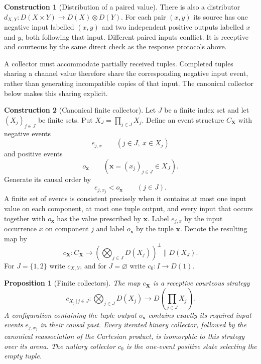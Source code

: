 \documentclass[11pt,a4paper]{article}
\numberwithin{equation}{section}
\newtheorem{proposition}[theorem]{Proposition}
\theoremstyle{definition}
\newtheorem{construction}[construction]{Construction}
\theoremstyle{remark}
\theoremstyle{plain}
\begin{document}
\begin{construction}[Distribution of a paired value]
There is also a distributor
$d_{X,Y}:D(X\times Y)\to D(X)\otimes D(Y)$. For each pair $(x,y)$ its
source has one negative input labelled $(x,y)$ and two independent positive
outputs labelled $x$ and $y$, both following that input. Different paired
inputs conflict. It is receptive and courteous by the same direct check as the
response protocols above.
\end{construction}

A collector must accommodate partially received tuples. Completed
tuples sharing a channel value therefore share the corresponding negative
input event, rather than generating incompatible copies of that input.
The canonical collector below makes this sharing explicit.

\begin{construction}[Canonical finite collector]
\label{con:egt-finite-collector}
Let $J$ be a finite index set and let $(X_j)_{j\in J}$ be finite sets. Put
$X_J=\prod_{j\in J}X_j$. Define an event structure $C_{\mathbf X}$ with
negative events
\[
 e_{j,x}\qquad(j\in J,\ x\in X_j)
\]
and positive events
\[
 o_{\mathbf x}\qquad(\mathbf x=(x_j)_{j\in J}\in X_J).
\]
Generate its causal order by
\[
 e_{j,x_j}<o_{\mathbf x}\qquad(j\in J).
\]
A finite set of events is consistent precisely when it contains at most one
input value on each component, at most one tuple output, and every input that
occurs together with $o_{\mathbf x}$ has the value prescribed by
$\mathbf x$. Label $e_{j,x}$ by the input occurrence $x$ on component $j$
and label $o_{\mathbf x}$ by the tuple $\mathbf x$. Denote the resulting map
by
\[
 c_{\mathbf X}:C_{\mathbf X}\longrightarrow
 \left(\bigotimes_{j\in J}D(X_j)\right)^\perp
 \parallel D(X_J).
\]
For $J=\{1,2\}$ write $c_{X,Y}$, and for $J=\varnothing$ write
$c_0:I\to D(1)$.
\end{construction}

\begin{proposition}[Finite collectors]
\label{prop:egt-finite-collectors}
The map $c_{\mathbf X}$ is a receptive courteous strategy
\[
 c_{X_j\,|\,j\in J}:
 \bigotimes_{j\in J}D(X_j)
 \longrightarrow
 D\!\left(\prod_{j\in J}X_j\right).
\]
A configuration containing the tuple output $o_{\mathbf x}$ contains exactly
its required input events $e_{j,x_j}$ in their causal past. Every iterated
binary collector, followed by the canonical reassociation of the Cartesian
product, is isomorphic to this strategy over its arena. The nullary collector
$c_0$ is the one-event positive state selecting the empty tuple.
\end{proposition}
\end{document}
